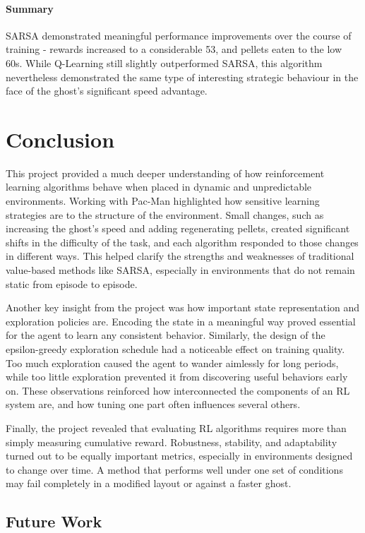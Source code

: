 \documentclass{article}
\begin{document}
\paragraph{Summary} SARSA demonstrated meaningful performance improvements over the course of training - rewards increased to a considerable 53, and pellets eaten to the low 60s. While Q-Learning still slightly outperformed SARSA, this algorithm nevertheless demonstrated the same type of interesting strategic behaviour in the face of the ghost's significant speed advantage. 


\section{Conclusion}

This project provided a much deeper understanding of how reinforcement learning algorithms behave when placed in dynamic and unpredictable environments. Working with Pac-Man highlighted how sensitive learning strategies are to the structure of the environment. Small changes, such as increasing the ghost’s speed and adding regenerating pellets, created significant shifts in the difficulty of the task, and each algorithm responded to those changes in different ways. This helped clarify the strengths and weaknesses of traditional value-based methods like SARSA, especially in environments that do not remain static from episode to episode.

Another key insight from the project was how important state representation and exploration policies are. Encoding the state in a meaningful way proved essential for the agent to learn any consistent behavior. Similarly, the design of the epsilon-greedy exploration schedule had a noticeable effect on training quality. Too much exploration caused the agent to wander aimlessly for long periods, while too little exploration prevented it from discovering useful behaviors early on. These observations reinforced how interconnected the components of an RL system are, and how tuning one part often influences several others.

Finally, the project revealed that evaluating RL algorithms requires more than simply measuring cumulative reward. Robustness, stability, and adaptability turned out to be equally important metrics, especially in environments designed to change over time. A method that performs well under one set of conditions may fail completely in a modified layout or against a faster ghost.


\subsection{Future Work}
\end{document}
